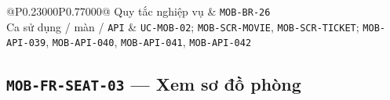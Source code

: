 \begin{longtable}{@{}P{0.23000\SRSWidth}P{0.77000\SRSWidth}@{}}
Quy tắc nghiệp vụ & \texttt{MOB-\allowbreak{}BR-\allowbreak{}26} \\[3pt]
Ca sử dụng /\allowbreak{} màn /\allowbreak{} \texttt{API} & \texttt{UC-\allowbreak{}MOB-\allowbreak{}02}; \texttt{MOB-\allowbreak{}SCR-\allowbreak{}MOVIE}, \texttt{MOB-\allowbreak{}SCR-\allowbreak{}TICKET}; \texttt{MOB-\allowbreak{}API-\allowbreak{}039}, \texttt{MOB-\allowbreak{}API-\allowbreak{}040}, \texttt{MOB-\allowbreak{}API-\allowbreak{}041}, \texttt{MOB-\allowbreak{}API-\allowbreak{}042} \\[3pt]
\end{longtable}
\endgroup

\subsection{\texttt{MOB-\allowbreak{}FR-\allowbreak{}SEAT-\allowbreak{}03} — Xem sơ đồ phòng}
\begingroup
\fontsize{9.5}{12}\selectfont
\setlength{\SRSWidth}{\dimexpr\linewidth-2\tabcolsep\relax}
